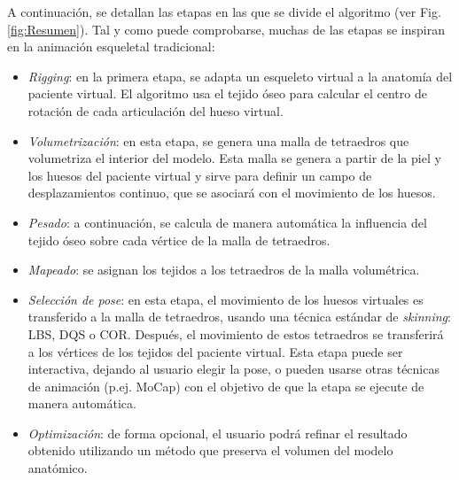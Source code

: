 A continuación, se detallan las etapas en las que se divide el algoritmo (ver Fig. \ref{fig:Resumen}). Tal y como puede comprobarse, muchas de las etapas se inspiran en la animación esqueletal tradicional:
\begin{itemize}

	\item \emph{Rigging}: %
	en la primera etapa, se adapta un esqueleto virtual a la anatomía del paciente virtual. El algoritmo usa el tejido óseo para calcular el centro de rotación de cada articulación del hueso virtual.
	
     \item \emph{Volumetrización}: en esta etapa, se genera una malla de tetraedros que volumetriza el interior del modelo. Esta malla se genera a partir de la piel y los huesos del paciente virtual y sirve para definir un campo de desplazamientos continuo, que se asociará con el movimiento de los huesos.

    \item \emph{Pesado}: a continuación, se calcula de manera automática la influencia del tejido óseo sobre cada vértice de la malla de tetraedros. 
    
    \item \emph{Mapeado}: se asignan los tejidos a los tetraedros de la malla volumétrica. 

    \item \emph{Selección de pose}: en esta etapa, el movimiento de los huesos virtuales es transferido a la malla de tetraedros, usando una técnica estándar de \emph{skinning}: \ac{LBS}, \ac{DQS} o \ac{COR}. 
    Después, el movimiento de estos tetraedros se transferirá a los vértices de los tejidos del paciente virtual.
    Esta etapa puede ser interactiva, dejando al usuario elegir la pose, o pueden usarse otras técnicas de animación (p.ej. \ac{MoCap}) con el objetivo de que la etapa se ejecute de manera automática.%
    \item \emph{Optimización}: de forma opcional, el usuario podrá refinar el resultado obtenido utilizando un método que preserva el volumen del modelo anatómico.
\end{itemize}

